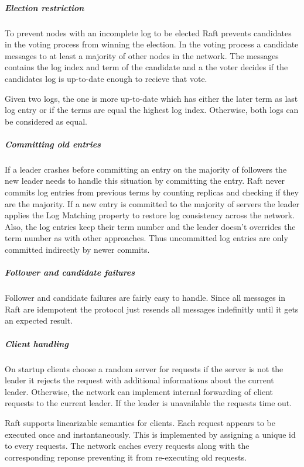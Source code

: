 \subparagraph{Election restriction}
To prevent nodes with an incomplete log to be elected
Raft prevents candidates in the voting process from winning
the election. In the voting process a candidate messages
to at least a majority of other nodes in the network.
The messages contains the log index and term of the candidate
and a the voter decides if the candidates log is up-to-date
enough to recieve that vote.~\cite{ongaro2014search}

\begin{defi}
  Given two logs, the one is more up-to-date which has
  either the later term as last log entry or if the terms
  are equal the highest log index. Otherwise, both logs
  can be considered as equal.
\end{defi}

\subparagraph{Committing old entries}
If a leader crashes before committing an entry on the
majority of followers the new leader needs to handle
this situation by committing the entry. Raft never commits
log entries from previous terms by counting replicas and
checking if they are the majority. If a new entry is committed
to the majority of servers the leader applies the Log Matching
property to restore log consistency across the network.
Also, the log entries keep their term number and the
leader doesn't overrides the term number as with other
approaches. Thus uncommitted log entries are only
committed indirectly by newer commits.~\cite{ongaro2014search}

\subparagraph{Follower and candidate failures}
Follower and candidate failures are fairly easy to handle.
Since all messages in Raft are idempotent the protocol
just resends all messages indefinitly until it gets
an expected result.~\cite{ongaro2014search}

\subparagraph{Client handling}
On startup clients choose a random server for
requests if the server is not the leader it rejects
the request with additional informations about the current leader.
Otherwise, the network can implement internal forwarding of client
requests to the current leader. If the leader is unavailable the
requests time out.~\cite{ongaro2014consensus}

Raft supports linearizable semantics for clients. Each request
appears to be executed once and instantaneously. This is implemented
by assigning a unique id to every requests. The network
caches every requests along with the corresponding reponse preventing
it from re-executing old requests.~\cite{ongaro2014consensus}

